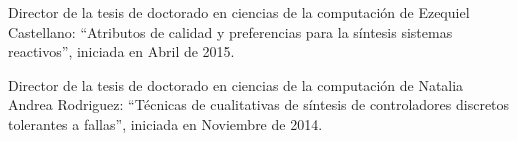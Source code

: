 \item Director de la tesis de doctorado en ciencias de la computaci\'on de Ezequiel Castellano: ``Atributos de calidad y preferencias para la s\'intesis sistemas reactivos'', iniciada en Abril de 2015.


\item Director de la tesis de doctorado en ciencias de la computaci\'on de Natalia Andrea Rodriguez: ``T\'ecnicas de cualitativas de s\'intesis de controladores discretos tolerantes a fallas'', iniciada en Noviembre de 2014.

